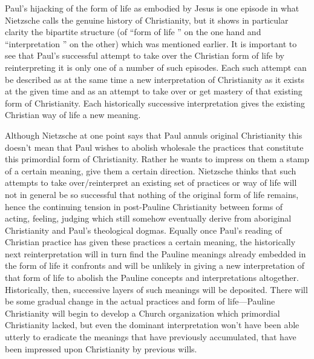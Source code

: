 Paul's hijacking of the form of life as embodied by Jesus is one episode in what Nietzsche calls the genuine history of Christianity, but it shows in particular clarity the bipartite structure (of  ``form of life '' on the one hand and  ``interpretation '' on the other) which was mentioned earlier. It is important to see that Paul's successful attempt to take over the Christian form of life by reinterpreting it is only one of a number of such episodes. Each such attempt can be described as at the same time a new interpretation of Christianity as it exists at the given time and as an attempt to take over or get mastery of that existing form of Christianity. Each historically successive interpretation gives the existing Christian way of life a new meaning.

Although Nietzsche at one point says that Paul annuls original Christianity this doesn't mean that Paul wishes to abolish wholesale the practices that constitute this primordial form of Christianity. Rather he wants to impress on them a stamp of a certain meaning, give them a certain direction. Nietzsche thinks that such attempts to take over/reinterpret an existing set of practices or way of life will not in general be so successful that nothing of the original form of life remains, hence the continuing tension in post-Pauline Christianity between forms of acting, feeling, judging which still somehow eventually derive from aboriginal Christianity and Paul's theological dogmas. Equally once Paul's reading of Christian practice has given these practices a certain meaning, the historically next reinterpretation will in turn find the Pauline meanings already embedded in the form of life it confronts and will be unlikely in giving a new interpretation of that form of life to abolish the Pauline concepts and interpretations altogether. Historically, then, successive layers of such meanings will be deposited. There will be some gradual change in the actual practices and form of life---Pauline Christianity will begin to develop a Church organization which primordial Christianity lacked, but even the dominant interpretation won't have been able utterly to eradicate the meanings that have previously accumulated, that have been impressed upon Christianity by previous wills.

